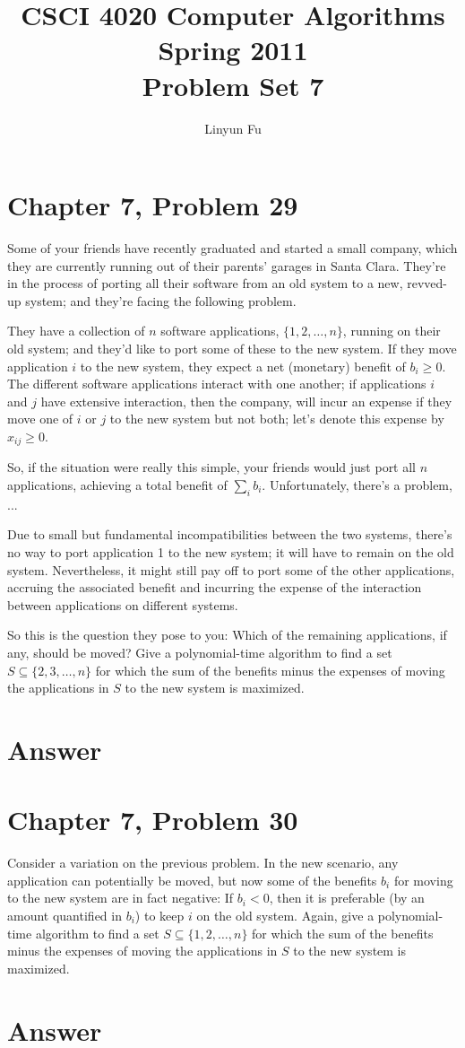 \documentclass[12pt,letterpaper]{article}
\author{Linyun Fu}
\title{CSCI 4020 Computer Algorithms Spring 2011\\
Problem Set 7}
\begin{document}
\maketitle
\section*{Chapter 7, Problem 29}
Some of your friends have recently graduated and started a small company,
which they are currently running out of their parents' garages in
Santa Clara. They're in the process of porting all their software from an
old system to a new, revved-up system; and they're facing the following
problem.

They have a collection of $n$ software applications, $\{1, 2, \dots, n\}$, running
on their old system; and they'd like to port some of these to the new
system. If they move application $i$ to the new system, they expect a net
(monetary) benefit of $b_i \ge 0$. The different software applications interact
with one another; if applications $i$ and $j$ have extensive interaction, then
the company, will incur an expense if they move one of $i$ or $j$ to the new
system but not both; let's denote this expense by $x_{ij} \ge 0$.

So, if the situation were really this simple, your friends would just
port all $n$ applications, achieving a total benefit of $\sum_i b_i$. Unfortunately,
there's a problem, ...

Due to small but fundamental incompatibilities between the two
systems, there's no way to port application 1 to the new system; it will
have to remain on the old system. Nevertheless, it might still pay off to
port some of the other applications, accruing the associated benefit and
incurring the expense of the interaction between applications on different
systems.

So this is the question they pose to you: Which of the remaining
applications, if any, should be moved? Give a polynomial-time algorithm
to find a set $S \subseteq \{2, 3, \dots, n\}$ for which the sum of the benefits minus the
expenses of moving the applications in $S$ to the new system is maximized.

\section*{Answer}

\section*{Chapter 7, Problem 30}
Consider a variation on the previous problem. In the new scenario, any
application can potentially be moved, but now some of the benefits $b_i$ for
moving to the new system are in fact negative: If $b_i < 0$, then it is preferable
(by an amount quantified in $b_i$) to keep $i$ on the old system. Again, give
a polynomial-time algorithm to find a set $S \subseteq \{1, 2, \dots, n\}$ for which the
sum of the benefits minus the expenses of moving the applications in $S$
to the new system is maximized.

\section*{Answer}
\end{document}
